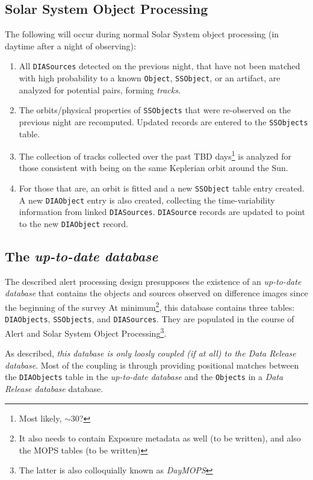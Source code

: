 \documentclass[12pt]{article}
\newcommand{\code}[1]{\texttt{#1}}
\newcommand{\DIASource}{\code{DIASource}\xspace}
\newcommand{\DIASources}{\code{DIASources}\xspace}
\newcommand{\DIAObject}{\code{DIAObject}\xspace}
\newcommand{\DIAObjects}{\code{DIAObjects}\xspace}
\newcommand{\DB}{{\em up-to-date database}\xspace}
\newcommand{\DR}{{\em Data Release database}\xspace}
\newcommand{\Object}{\code{Object}\xspace}
\newcommand{\Objects}{\code{Objects}\xspace}
\newcommand{\SSObject}{\code{SSObject}\xspace}
\newcommand{\SSObjects}{\code{SSObjects}\xspace}
\begin{document}
\subsection{Solar System Object Processing}
\label{sec:ssProcessing}

The following will occur during normal Solar System object processing (in daytime after a night of observing):
\begin{enumerate}
\item All \DIASources detected on the previous night, that have not been matched with high probability to a known \Object, \SSObject, or an artifact, are analyzed for potential pairs, forming {\em tracks}.
\item The orbits/physical properties of \SSObjects that were re-observed on the previous night are recomputed. Updated records are entered to the \SSObjects table.
\item The collection of tracks collected over the past TBD days\footnote{Most likely, $\sim 30$?} is analyzed for those consistent with being on the same Keplerian orbit around the Sun.
\item For those that are, an orbit is fitted and a new \SSObject table entry created. A new \DIAObject entry is also created, collecting the time-variability information from linked \DIASources. \DIASource records are updated to point to the new \DIAObject record.
\end{enumerate}

\subsection{The \DB}

The described alert processing design presupposes the existence of an \DB that contains the objects and sources observed on difference images since the beginning of the survey At minimum\footnote{It also needs to contain Exposure metadata as well (to be written), and also the MOPS tables (to be written)}, this database contains three tables: \DIAObjects, \SSObjects, and \DIASources. They are populated in the course of Alert and Solar System Object Processing\footnote{The latter is also colloquially known as {\em DayMOPS}}.

As described, {\em this database is only loosly coupled (if at all) to the \DR}. Most of the coupling is through providing positional matches between the \DIAObjects table in the \DB and the \Objects in a \DR database.
\end{document}
